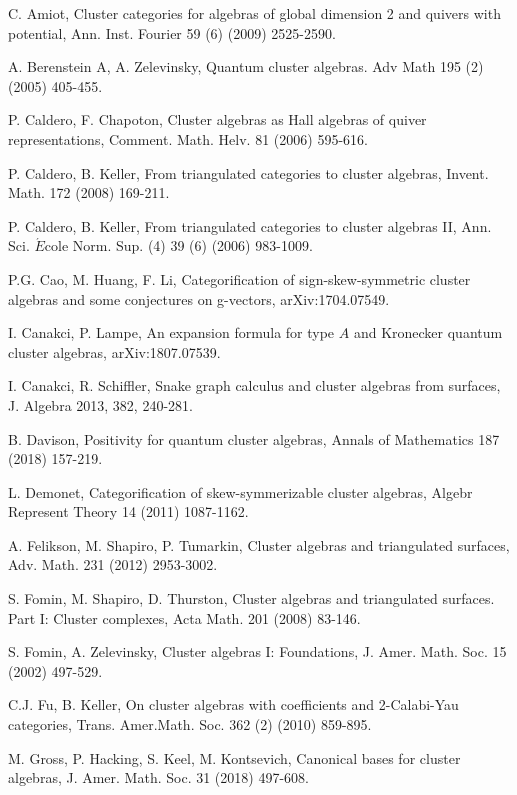 \documentclass[10pt]{amsart}
\theoremstyle{theorems}
\begin{document}
\begin{thebibliography}{abcdsfgh}

 C. Amiot, Cluster categories for algebras of global dimension 2 and quivers with potential, Ann. Inst. Fourier 59 (6) (2009) 2525-2590.

 A. Berenstein A, A. Zelevinsky, Quantum cluster algebras. Adv Math 195 (2) (2005) 405-455.

 P. Caldero, F. Chapoton, Cluster algebras as Hall algebras of quiver representations, Comment. Math. Helv. 81 (2006) 595-616.

 P. Caldero, B. Keller, From triangulated categories to cluster algebras, Invent. Math. 172 (2008) 169-211.

 P. Caldero, B. Keller, From triangulated categories to cluster algebras II, Ann. Sci. $\acute{E}$cole Norm. Sup. (4) 39 (6) (2006) 983-1009.

 P.G. Cao, M. Huang, F. Li, Categorification of sign-skew-symmetric cluster algebras and some conjectures on g-vectors, arXiv:1704.07549.

 I. Canakci, P. Lampe, An expansion formula for type $A$ and Kronecker quantum cluster algebras, arXiv:1807.07539.

 I. Canakci, R. Schiffler, Snake graph calculus and cluster algebras from surfaces, J. Algebra 2013, 382, 240-281.

 B. Davison, Positivity for quantum cluster algebras, Annals of Mathematics 187 (2018) 157-219.

 L. Demonet, Categorification of skew-symmerizable cluster algebras, Algebr Represent Theory 14 (2011) 1087-1162.

 A. Felikson, M. Shapiro, P. Tumarkin, Cluster algebras and triangulated surfaces, Adv. Math. 231 (2012) 2953-3002.

 S. Fomin, M. Shapiro, D. Thurston, Cluster algebras and triangulated surfaces. Part I: Cluster complexes, Acta Math. 201 (2008) 83-146.

 S. Fomin, A. Zelevinsky, Cluster algebras I: Foundations, J. Amer. Math. Soc. 15 (2002) 497-529.

 C.J. Fu, B. Keller, On cluster algebras with coefficients and 2-Calabi-Yau categories, Trans. Amer.Math. Soc. 362 (2) (2010) 859-895.

 M. Gross, P. Hacking, S. Keel, M. Kontsevich, Canonical bases for cluster algebras, J. Amer. Math. Soc. 31 (2018) 497-608.


\end{thebibliography}
\end{document}
